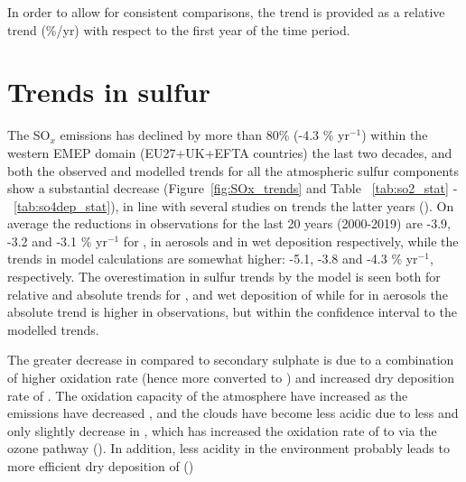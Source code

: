 In order to allow for consistent comparisons, the trend is provided as a relative trend (\%/yr) with respect to the first year of the time period.



\section{\label{sec:Trends_sulfur}Trends in sulfur}

The SO$_x$ emissions has declined by more than 80\% (-4.3 \% yr$^{-1}$) within the western EMEP domain (EU27+UK+EFTA countries) the last two decades, and both the observed and modelled trends for all the atmospheric sulfur components show a substantial decrease (Figure~\ref{fig:SOx_trends} and Table ~\ref{tab:so2_stat} - ~\ref{tab:so4dep_stat}), in line with several studies on trends the latter years (\cite{aas2019global, Colette2012, Vivanco2018, Theobald2019, Colette2021, Banzhaf2015, torseth2012, Crippa2016}). On average the reductions in observations for the last 20 years (2000-2019) are -3.9, -3.2 and -3.1  \% yr$^{-1}$ for \soii, \soiv in aerosols and in wet deposition respectively, while the trends in model calculations are somewhat higher: -5.1, -3.8 and -4.3 \% yr$^{-1}$, respectively. The overestimation in sulfur trends by the model is seen both for relative and absolute trends for \soii, and wet deposition of \soiv while for \soiv in aerosols the absolute trend is higher in observations, but within the confidence interval to the modelled trends.



The  greater decrease in \soii compared to secondary sulphate is due to a combination of higher oxidation rate (hence more \soii converted to \soiv) and increased dry deposition rate of \soii. The oxidation capacity of the atmosphere have increased as the emissions have decreased \cite{Dalsoren2016}, and the clouds have become less acidic due to less \soii and only slightly decrease in \nhiii, which has increased the oxidation rate of \soii to \soiv via the ozone pathway (\cite{Banzhaf2015, Redington2009}). In addition, less acidity in the environment probably leads to more efficient dry deposition of \soii (\cite{Fowler_et_al:2009}) 



